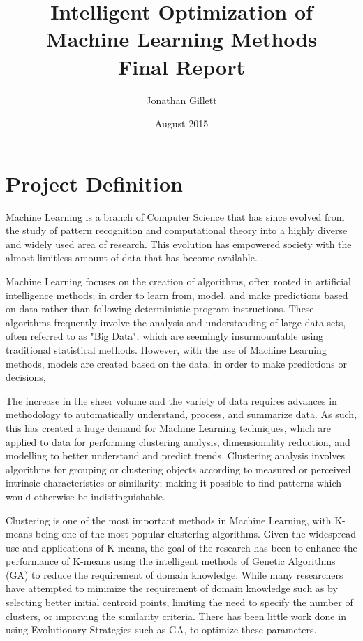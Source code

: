 \documentclass{article}
\title{Intelligent Optimization of Machine Learning Methods\\[0.8em]Final Report}
\author{Jonathan Gillett}
\date{August 2015}
\begin{document}
\maketitle


\section{Project Definition}

Machine Learning is a branch of Computer Science that has since evolved from the study of pattern recognition and computational theory into a highly diverse and widely used area of research. This evolution has empowered society with the almost limitless amount of data that has become available\cite{lohr2012age, mohri2012foundations}.

Machine Learning focuses on the creation of algorithms, often rooted in artificial intelligence methods; in order to learn from, model, and make predictions based on data rather than following deterministic program instructions\cite{dietterich2002machine, bishop2006pattern}. These algorithms frequently involve the analysis and understanding of large data sets, often referred to as "Big Data", which are seemingly insurmountable using traditional statistical methods\cite{lohr2012age}. However, with the use of Machine Learning methods, models are created based on the data, in order to make predictions or decisions, 

The increase in the sheer volume and the variety of data requires advances in methodology to automatically understand, process, and summarize data. As such, this has created a huge demand for Machine Learning techniques, which are applied to data for performing clustering analysis, dimensionality reduction, and modelling to better understand and predict trends. Clustering analysis involves algorithms for grouping or clustering objects according to measured or perceived intrinsic characteristics or similarity; making it possible to find patterns which would otherwise be indistinguishable\cite{jain2010}. 

Clustering is one of the most important methods in Machine Learning, with K-means being one of the most popular clustering algorithms. Given the widespread use and applications of K-means, the goal of the research has been to enhance the performance of K-means using the intelligent methods of Genetic Algorithms (GA) to reduce the requirement of domain knowledge. While many researchers have attempted to minimize the requirement of domain knowledge such as by selecting better initial centroid points\cite{meilua2006uniqueness}, limiting the need to specify the number of clusters\cite{tibshirani2001estimating}, or improving the similarity criteria\cite{kashima2008k}. There has been little work done in using Evolutionary Strategies such as GA, to optimize these parameters.
\end{document}
